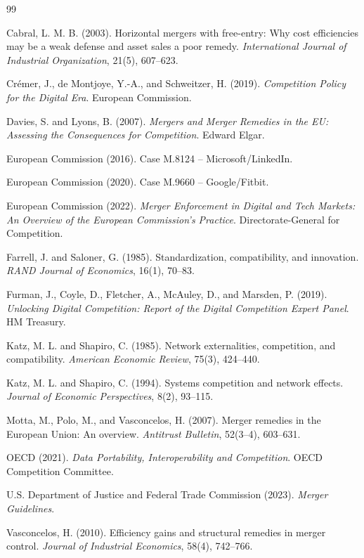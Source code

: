 \documentclass[12pt]{article}
\begin{document}
\begin{thebibliography}{99}

Cabral, L. M. B. (2003).
Horizontal mergers with free-entry: Why cost efficiencies may be a weak defense and asset sales a poor remedy.
\textit{International Journal of Industrial Organization}, 21(5), 607--623.

Cr\'emer, J., de Montjoye, Y.-A., and Schweitzer, H. (2019).
\textit{Competition Policy for the Digital Era}.
European Commission.

Davies, S. and Lyons, B. (2007).
\textit{Mergers and Merger Remedies in the EU: Assessing the Consequences for Competition}.
Edward Elgar.

European Commission (2016).
Case M.8124 -- Microsoft/LinkedIn.

European Commission (2020).
Case M.9660 -- Google/Fitbit.

European Commission (2022).
\textit{Merger Enforcement in Digital and Tech Markets: An Overview of the European Commission's Practice}.
Directorate-General for Competition.

Farrell, J. and Saloner, G. (1985).
Standardization, compatibility, and innovation.
\textit{RAND Journal of Economics}, 16(1), 70--83.

Furman, J., Coyle, D., Fletcher, A., McAuley, D., and Marsden, P. (2019).
\textit{Unlocking Digital Competition: Report of the Digital Competition Expert Panel}.
HM Treasury.

Katz, M. L. and Shapiro, C. (1985).
Network externalities, competition, and compatibility.
\textit{American Economic Review}, 75(3), 424--440.

Katz, M. L. and Shapiro, C. (1994).
Systems competition and network effects.
\textit{Journal of Economic Perspectives}, 8(2), 93--115.

Motta, M., Polo, M., and Vasconcelos, H. (2007).
Merger remedies in the European Union: An overview.
\textit{Antitrust Bulletin}, 52(3--4), 603--631.

OECD (2021).
\textit{Data Portability, Interoperability and Competition}.
OECD Competition Committee.

U.S. Department of Justice and Federal Trade Commission (2023).
\textit{Merger Guidelines}.

Vasconcelos, H. (2010).
Efficiency gains and structural remedies in merger control.
\textit{Journal of Industrial Economics}, 58(4), 742--766.

\end{thebibliography}
\end{document}
